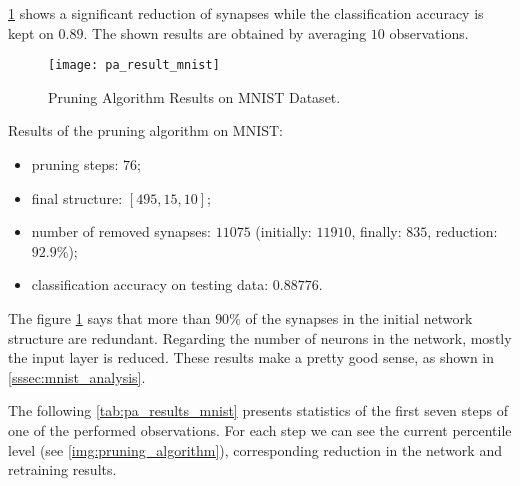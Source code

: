 \cref{fig:pa_result_mnist} shows a significant reduction of synapses while the classification accuracy is kept on $ 0.89 $. The shown results are obtained by averaging $ 10 $ observations.
\begin{figure}[H]
  \centering
  \texttt{[image: pa\_result\_mnist]}
  \caption{Pruning Algorithm Results on MNIST Dataset.}
  \label{fig:pa_result_mnist}
\end{figure}

Results of the pruning algorithm on MNIST:
\begin{itemize}
\item pruning steps: $ 76 $;
\item final structure: $ [495, 15, 10] $;
\item number of removed synapses: $ 11075 $ (initially: $ 11910 $, finally: $ 835 $, reduction: $ 92.9\% $);
\item classification accuracy on testing data: $ 0.88776 $.
\end{itemize}

The figure \ref{fig:pa_result_mnist} says that more than $ 90\% $ of the synapses in the initial network structure are redundant. Regarding the number of neurons in the network, mostly the input layer is reduced. These results make a pretty good sense, as shown in \cref{sssec:mnist_analysis}.

The following \cref{tab:pa_results_mnist} presents statistics of the first seven steps of one of the performed observations. For each step we can see the current percentile level (see \cref{img:pruning_algorithm}), corresponding reduction in the network and retraining results.

